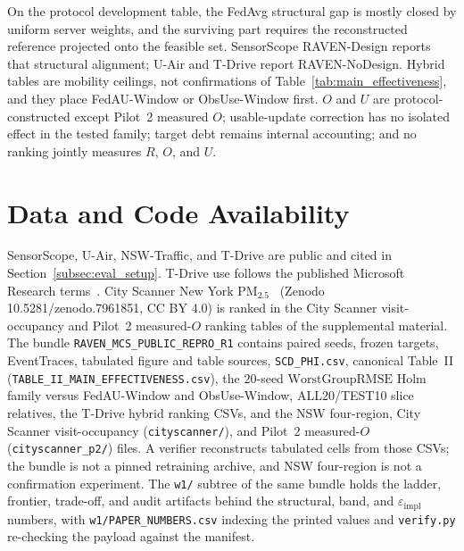 \documentclass[letterpaper,journal]{IEEEtran}
\begin{document}
On the protocol development table, the FedAvg structural gap is mostly
closed by uniform server weights, and the surviving part requires the
reconstructed reference projected onto the feasible set.  SensorScope
RAVEN-Design reports that structural alignment; U-Air and T-Drive report
RAVEN-NoDesign.  Hybrid tables are mobility ceilings, not confirmations of
Table~\ref{tab:main_effectiveness}, and they place FedAU-Window or ObsUse-Window
first.  $O$ and $U$ are protocol-constructed except Pilot~2 measured $O$;
usable-update correction has no isolated effect in the tested family; target debt
remains internal accounting; and no ranking jointly measures $R$, $O$, and $U$.

\section*{Data and Code Availability}
SensorScope, U-Air, NSW-Traffic, and T-Drive are public and cited in
Section~\ref{subsec:eval_setup}.  T-Drive use follows the published
Microsoft Research terms~\cite{yuan2010tdrive}.
City Scanner New York {PM}$_{2.5}$~\cite{wang2023cityscanner}
(Zenodo 10.5281/zenodo.7961851, CC BY 4.0) is ranked in
the City Scanner visit-occupancy and Pilot~2 measured-$O$ ranking tables of the
supplemental material.
The bundle \texttt{RAVEN\_MCS\_PUBLIC\_REPRO\_R1} contains paired seeds,
frozen targets, EventTraces, tabulated figure and table sources,
\texttt{SCD\_PHI.csv}, canonical Table~II
(\texttt{TABLE\_II\_MAIN\_EFFECTIVENESS.csv}),
the $20$-seed $\mathrm{WorstGroupRMSE}$ Holm family versus FedAU-Window and
ObsUse-Window, ALL20/TEST10 slice relatives, the T-Drive hybrid ranking CSVs,
and the NSW four-region, City Scanner visit-occupancy
(\texttt{cityscanner/}), and Pilot~2 measured-$O$ (\texttt{cityscanner\_p2/})
files.  A verifier reconstructs tabulated cells from those CSVs; the bundle is
not a pinned retraining archive, and NSW four-region is not a confirmation
experiment.  The \texttt{w1/} subtree of the same bundle holds the ladder,
frontier, trade-off, and audit artifacts behind the structural, band, and
$\varepsilon_{\mathrm{impl}}$ numbers, with \texttt{w1/PAPER\_NUMBERS.csv}
indexing the printed values and \texttt{verify.py} re-checking the payload
against the manifest.
\end{document}

